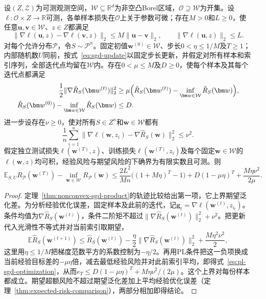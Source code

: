 \begin{theorem}[PL条件下非凸SGD的学习保证]
\label{thm:pl-stability-learning}
设$(Z,\mathcal Z)$为可测观测空间，$\mathcal W\subseteq\mathbb R^d$为非空凸Borel区域，$\mathcal O\supseteq\mathcal W$为开集。设$\ell:\mathcal O\times Z\to\mathbb R$可测，各单样本损失在$\mathcal O$上关于参数可微；存在$M>0$和$L\geq0$，使任意$\bm u,\bm v\in\mathcal W$、$z\in Z$都满足
\[
 \|\nabla\ell(\bm u,z)-\nabla\ell(\bm v,z)\|_2\leq M\|\bm u-\bm v\|_2,
 \qquad
 \|\nabla\ell(\bm u,z)\|_2\leq L.
\]
对每个允许分布$\mathcal P$，令$S\sim\mathcal P^n$。固定初值$\bm w^{(0)}\in\mathcal W$、步长$0<\eta\leq1/M$及$T\geq1$；内部随机数$U$同前，按式~\eqref{eq:sgd-update}以固定步长更新，并假定对所有样本和索引序列，全部迭代点均留在$\mathcal W$内。存在$0<\mu\leq M$及$D\geq0$，使每个样本及其每个迭代点都满足
\[
\begin{aligned}
 \frac12\|\nabla\hat R_S(\bm w^{(t)})\|_2^2
 &\geq\mu\Bigl(\hat R_S(\bm w^{(t)})-\inf_{\bm w\in\mathcal W}\hat R_S(\bm w)\Bigr),\\
 \hat R_S(\bm w^{(0)})-\inf_{\bm w\in\mathcal W}\hat R_S(\bm w)&\leq D.
\end{aligned}
\]
进一步设存在$\nu\geq0$，使对所有$S\in Z^n$和$\bm w\in\mathcal W$都有
\[
 \frac1n\sum_{i=1}^n\|\nabla\ell(\bm w,z_i)-\nabla\hat R_S(\bm w)\|_2^2\leq\nu^2.
\]
假定独立测试损失$\ell(\bm w^{(T)},z)$、训练损失$\ell(\bm w^{(T)},z_i)$及每个固定$\bm w\in\mathcal W$的$\ell(\bm w,z)$均可积，经验风险与期望风险的下确界为有限实数且可测。则
\[
 \mathbb E_{S,U}R_{\mathcal P}(\bm w^{(T)})-\inf_{\bm w\in\mathcal W}R_{\mathcal P}(\bm w)
 \leq\frac{2L^2}{Mn}\bigl((1+M\eta)^T-1\bigr)+D(1-\mu\eta)^T+\frac{M\eta\nu^2}{2\mu}.
\]
\end{theorem}
\begin{proof}
定理~\ref{thm:nonconvex-sgd-product}的轨迹比较给出第一项，它上界期望泛化差。为分析经验优化误差，固定样本及此前的迭代，记$\bm g_t=\nabla\ell(\bm w^{(t)},z_{i_t})$。条件均值为$\nabla\hat R_S(\bm w^{(t)})$，条件二阶矩不超过$\|\nabla\hat R_S(\bm w^{(t)})\|_2^2+\nu^2$。把更新代入光滑性不等式并对当前索引取期望，
\[
 \mathbb E\hat R_S(\bm w^{(t+1)})
 \leq\hat R_S(\bm w^{(t)})-\frac\eta2\|\nabla\hat R_S(\bm w^{(t)})\|_2^2+\frac{M\eta^2\nu^2}{2},
\]
这里用$\eta\leq1/M$把梯度范数平方的系数控制为$-\eta/2$。再用PL条件把这一负项换成当前经验目标差的$-\mu\eta$倍，减去最低经验风险并对此前索引平均，即得式~\eqref{eq:pl-sgd-optimization}，从而$e_T\leq D(1-\mu\eta)^T+M\eta\nu^2/(2\mu)$。这个上界对每份样本都成立。期望超额风险不超过期望泛化差加上平均经验优化误差（定理~\ref{thm:expected-risk-comparison}），两部分相加即得结论。
\end{proof}

